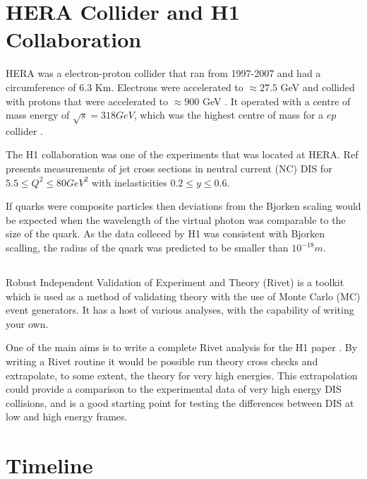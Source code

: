 \documentclass[journal, a4paper,11pt]{IEEEtran}
\begin{document}
\section{HERA Collider and H1 Collaboration}

HERA was a electron-proton collider that ran from 1997-2007 and had a circumference of 6.3 Km. Electrons were accelerated to $\approx 27.5$ GeV and collided with protons that were accelerated to $\approx 900$ GeV \cite{Modern}. It operated with a centre of mass energy of $\sqrt{s} = 318 GeV$, which was the highest centre of mass for a $ep$ collider \cite{1308}.

The H1 collaboration \cite{H1} was one of the experiments that was located at HERA. Ref \cite{H1} presents measurements of jet cross sections in neutral current (NC) DIS for $5.5 \leq Q^2 \leq 80 GeV^2$ with inelasticities $0.2 \leq y \leq 0.6$. 

If quarks were composite particles then deviations from the Bjorken scaling would be expected when the wavelength of the virtual photon was comparable to the size of the quark. As the data colleced by H1 was consistent with Bjorken scalling, the radius of the quark was predicted to be smaller than $10^{-18}m$.

\subsection*{}

Robust Independent Validation of Experiment and Theory (Rivet) is a toolkit which is used as a method of validating theory with the use of Monte Carlo (MC) event generators. It has a host of various analyses, with the capability of writing your own. 

One of the main aims is to write a complete Rivet analysis for the H1 paper \cite{H1}. By writing a Rivet routine it would be possible run theory cross checks and extrapolate, to some extent, the theory for very high energies. This extrapolation could provide a comparison to the experimental data of very high energy DIS collisions, and is a good starting point for testing the differences between DIS at low and high energy frames.


\section{Timeline}





\end{document}
